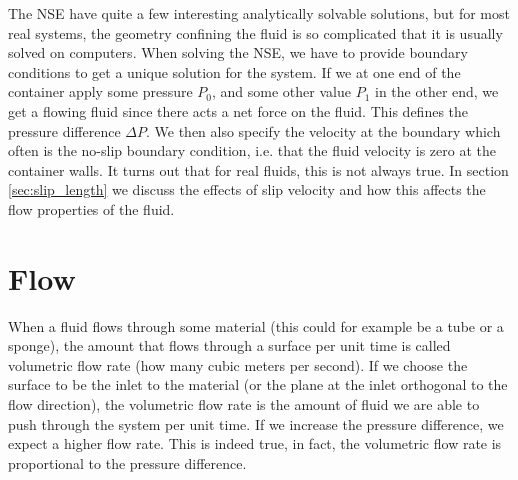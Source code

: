 The NSE have quite a few interesting analytically solvable solutions, but for most real systems, the geometry confining the fluid is so complicated that it is usually solved on computers. When solving the NSE, we have to provide boundary conditions to get a unique solution for the system. If we at one end of the container apply some pressure $P_0$, and some other value $P_1$ in the other end, we get a flowing fluid since there acts a net force on the fluid. This defines the pressure difference $\Delta P$. We then also specify the velocity at the boundary which often is the no-slip boundary condition, i.e. that the fluid velocity is zero at the container walls. It turns out that for real fluids, this is not always true. In section \ref{sec:slip_length} we discuss the effects of slip velocity and how this affects the flow properties of the fluid. 
\section{Flow}
When a fluid flows through some material (this could for example be a tube or a sponge), the amount that flows through a surface per unit time is called volumetric flow rate (how many cubic meters per second). If we choose the surface to be the inlet to the material (or the plane at the inlet orthogonal to the flow direction), the volumetric flow rate is the amount of fluid we are able to push through the system per unit time. If we increase the pressure difference, we expect a higher flow rate. This is indeed true, in fact, the volumetric flow rate is proportional to the pressure difference.
